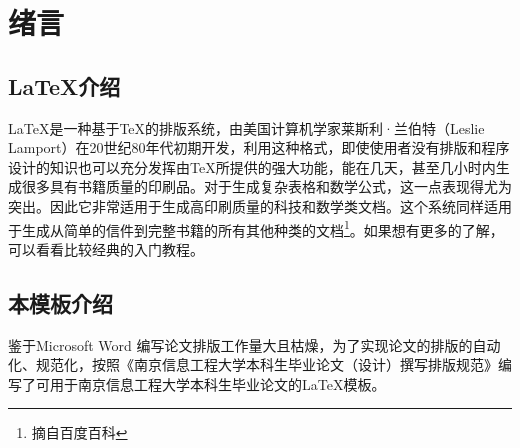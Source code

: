 
\section{绪言}

\subsection{\LaTeX 介绍}

\LaTeX 是一种基于\TeX 的排版系统，由美国计算机学家莱斯利·兰伯特（Leslie Lamport）在20世纪80年代初期开发，利用这种格式，即使使用者没有排版和程序设计的知识也可以充分发挥由\TeX 所提供的强大功能，能在几天，甚至几小时内生成很多具有书籍质量的印刷品。对于生成复杂表格和数学公式，这一点表现得尤为突出。因此它非常适用于生成高印刷质量的科技和数学类文档。这个系统同样适用于生成从简单的信件到完整书籍的所有其他种类的文档\footnote{摘自百度百科}。如果想有更多的了解，可以看看比较经典的入门教程。

\subsection{本模板介绍}

鉴于Microsoft Word 编写论文排版工作量大且枯燥，为了实现论文的排版的自动化、规范化，按照《南京信息工程大学本科生毕业论文（设计）撰写排版规范》编写了可用于南京信息工程大学本科生毕业论文的\LaTeX 模板。